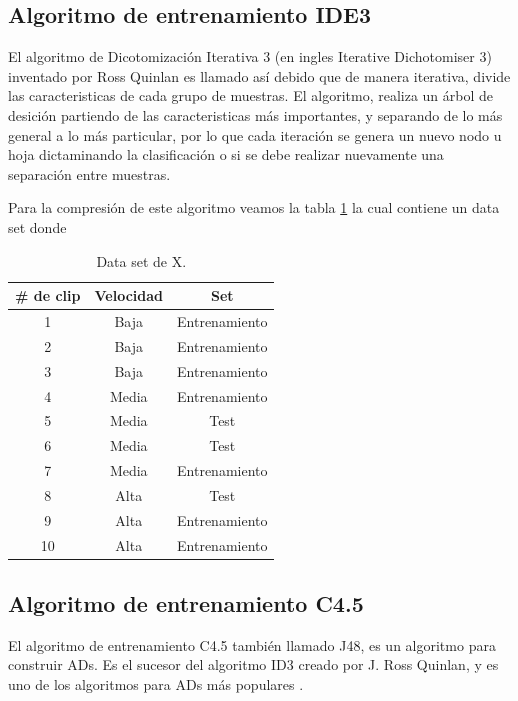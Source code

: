 \documentclass[twoside,spanish,ESP,MSc]{plantillaLabUPV}
\theoremstyle{definition}
\begin{document}
\subsection{Algoritmo de entrenamiento IDE3}

El algoritmo de Dicotomización Iterativa 3 (en ingles Iterative Dichotomiser 3) inventado por Ross Quinlan es llamado así debido que de manera iterativa, divide las caracteristicas de cada grupo de muestras. El algoritmo, realiza un árbol de desición partiendo de las caracteristicas más importantes, y separando de lo más general a lo más particular, por lo que cada iteración se genera un nuevo nodo u hoja dictaminando la clasificación o si se debe realizar nuevamente una separación entre muestras.

Para la compresión de este algoritmo veamos la tabla \ref{tabliqui}
la cual contiene un data set donde 

\begin{table}[h]
	\caption{Data set de X.}
	\label{tabliqui}
	\centering
	\begin{tabular}{|c|c|c|}
		\hline
		\# de clip & Velocidad & Set \\
		\hline
		1 & Baja & Entrenamiento \\
		\hline
		2 & Baja & Entrenamiento \\
		\hline
		3 & Baja & Entrenamiento \\
		\hline
		4 & Media & Entrenamiento \\
		\hline
		5 & Media & Test \\
		\hline
		6 & Media & Test \\
		\hline
		7 & Media & Entrenamiento \\
		\hline
		8 & Alta & Test \\
		\hline
		9 & Alta & Entrenamiento \\
		\hline
		10 & Alta & Entrenamiento \\
		\hline
	\end{tabular}
\end{table}


\subsection{Algoritmo de entrenamiento C4.5}

El algoritmo de entrenamiento C4.5 también llamado J48, es un algoritmo para construir ADs. Es el sucesor del algoritmo ID3 creado por J. Ross Quinlan, y es uno de los algoritmos para ADs más populares \cite{c45salz}. 
\end{document}
